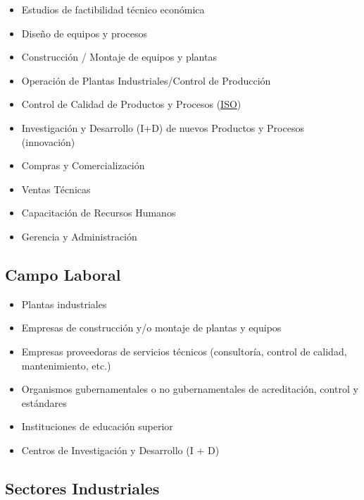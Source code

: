     \begin{multicols}{2}
        \begin{itemize}
            \item Estudios de factibilidad técnico económica
            \item Diseño de equipos y procesos
            \item Construcción / Montaje de equipos y plantas
            \item Operación de Plantas Industriales/Control de Producción
            \item Control de Calidad de Productos y Procesos (\href{https://www.iso.org/home.html}{ISO})
            \item Investigación y Desarrollo (I+D) de nuevos Productos y Procesos (innovación)
            \item Compras y Comercialización
            \item Ventas Técnicas
            \item Capacitación de Recursos Humanos
            \item Gerencia y Administración
        \end{itemize}
    \end{multicols}
    
    \subsection{Campo Laboral}
    
    \begin{multicols}{2}
        \begin{itemize}
            \item Plantas industriales
            \item Empresas de construcción y/o montaje de plantas y equipos
            \item Empresas proveedoras de servicios técnicos (consultoría, control de calidad, mantenimiento, etc.)
            \item Organismos gubernamentales o no gubernamentales de acreditación, control y estándares
            \item Instituciones de educación superior
            \item Centros de Investigación y Desarrollo (I + D)
        \end{itemize}
    \end{multicols}
    
    \subsection{Sectores Industriales}
    
